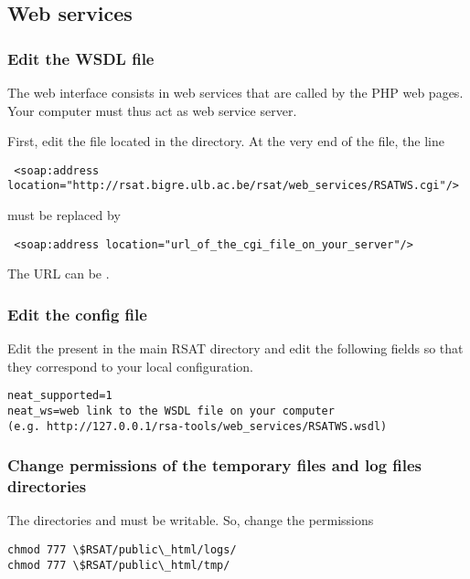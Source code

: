 \documentclass{book}
\begin{document}
\subsection{Web services}

\subsubsection{Edit the WSDL file}
The web interface consists in web services that are called by the PHP web pages. Your computer must thus act as web service server.

First, edit the file  located in the
 directory.
At the very end of the file, the line

\begin{footnotesize}
\begin{verbatim}
 <soap:address location="http://rsat.bigre.ulb.ac.be/rsat/web_services/RSATWS.cgi"/>
\end{verbatim}
\end{footnotesize}

must be replaced by

\begin{footnotesize}
\begin{verbatim}
 <soap:address location="url_of_the_cgi_file_on_your_server"/>
\end{verbatim}
\end{footnotesize}

The URL can be .

\subsubsection{Edit the \neat config file}

Edit the  present in the main RSAT directory and edit the following fields so that they correspond to your local configuration.

\begin{footnotesize}
\begin{verbatim}
neat_supported=1
neat_ws=web link to the WSDL file on your computer
(e.g. http://127.0.0.1/rsa-tools/web_services/RSATWS.wsdl)
\end{verbatim}
\end{footnotesize}

\subsubsection{Change permissions of the temporary files and log files directories}

The directories  and  must be writable. So, change the permissions

\begin{footnotesize}
\begin{verbatim}
chmod 777 \$RSAT/public\_html/logs/
chmod 777 \$RSAT/public\_html/tmp/
\end{verbatim}
\end{footnotesize}
\end{document}

